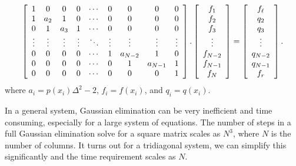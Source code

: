 \begin{align}
  \left[ \begin{array}{c c c c c c c c c} 
  1      & 0      & 0      & 0      & \cdots & 0      & 0       & 0       & 0       \\
  1      & a_2    & 1  	   & 0      & \cdots & 0      & 0       & 0       & 0       \\
  0      & 1      & a_3    & 1      & \cdots & 0      & 0       & 0       & 0       \\
  \vdots & \vdots & \vdots & \vdots & \ddots & \vdots & \vdots  & \vdots  & \vdots  \\
  0      & 0      & 0      & 0      & \cdots & 1      & a_{N-2} & 1       & 0       \\
  0      & 0      & 0      & 0      & \cdots & 0      & 1       & a_{N-1} & 1       \\
  0      & 0      & 0      & 0      & \cdots & 0      & 0       & 0       & 1       \\ 
  \end{array} \right] . 
  \left[ \begin{array}{c} f_1    \\ f_2 \\ f_3 \\ \vdots \\ f_{N-2} \\ f_{N-1} \\ f_N \\ \end{array} \right] =
  \left[ \begin{array}{c} f_\ell \\ q_2 \\ q_3 \\ \vdots \\ q_{N-2} \\ q_{N-1} \\ f_r \\ \end{array} \right] .
\end{align}
where $a_i = p(x_i) \Delta^2 - 2$, $f_i = f(x_i)$, and $q_i = q(x_i)$.

In a general system, Gaussian elimination can be very inefficient and time consuming, especially for a large system of equations. The number of steps in a full Gaussian elimination solve for a square matrix scales as $N^3$, where $N$ is the number of columns. It turns out for a tridiagonal system, we can simplify this significantly and the time requirement scales as $N$.

